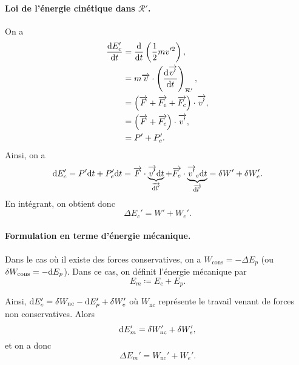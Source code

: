             \paragraph{Loi de l'énergie cinétique dans $\mathcal{R}'$.}
                On a 
                \begin{align}
                    \frac{\mathrm{d} E_{c}'}{\mathrm{d} t} 
                    &= \frac{\mathrm{d}}{\mathrm{d} t}\left(\frac{1}{2}m v'^{2}\right),\\
                    &= m\protect\overrightarrow{{v}}\cdot\left(\frac{\mathrm{d}\protect\overrightarrow{{v'}}}{\mathrm{d} t}\right)_{\mathcal{R}'},\\
                    &=\left(\protect\overrightarrow{{F}}+\protect\overrightarrow{{F_e}}+\protect\overrightarrow{{F_c}}\right)\cdot\protect\overrightarrow{{v'}},\\
                    &=\left(\protect\overrightarrow{{F}}+\protect\overrightarrow{{F_e}}\right)\cdot\protect\overrightarrow{{v'}},\\
                    &=P' + P_e'.
                \end{align}
                Ainsi, on a 
                \begin{equation}
                    \mathrm{d} E_c'=P'\mathrm{d} t+P_e'\mathrm{d} t=\protect\overrightarrow{{F}}\cdot\underbrace{\protect\overrightarrow{{v'}}\mathrm{d} t}_{\protect\overrightarrow{{\mathrm{d} l'}}}+\protect\overrightarrow{{F_e}}\cdot\underbrace{\protect\overrightarrow{{v'}}_e\mathrm{d} t}_{\protect\overrightarrow{{\mathrm{d} l'}}}=\delta W'+\delta W_e'.
                \end{equation}
                En intégrant, on obtient donc
                \begin{equation}
                    \boxed{\Delta E_c'=W'+W_e'.}    
                \end{equation}
            
            \paragraph{Formulation en terme d'énergie mécanique.} Dans le cas où il existe des forces conservatives, on a $W_{\text{cons}}=-\Delta E_p$ (ou $\delta W_{\text{cons}}=-\mathrm{d} E_p$). Dans ce cas, on définit l'énergie mécanique par
            \begin{equation}
                \boxed{E_m\coloneqq E_c+E_p.}
            \end{equation}

            Ainsi, $\mathrm{d} E_c'=\delta W_{\text{nc}}-\mathrm{d} E_p'+\delta W_e'$ où $W_{\text{nc}}$ représente le travail venant de forces non conservatives. Alors 
            \begin{equation}
                \mathrm{d} E_m'=\delta W_{\text{nc}}'+\delta W_{e}',
            \end{equation}
            et on a donc
            \begin{equation}
                \boxed{\Delta E_m'=W_{\text{nc}}'+W_e'.}
            \end{equation}
        
